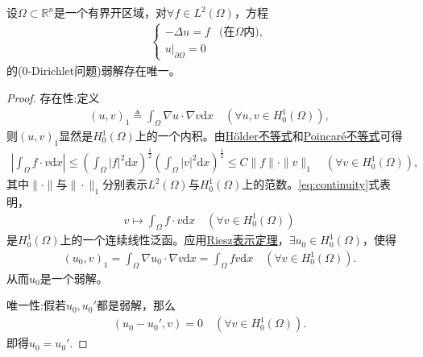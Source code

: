 \documentclass[../../main.tex]{subfiles}%
\begin{document}
\begin{theorem}
设$\Omega\subset\mathbb{R}^n$是一个有界开区域，对$\forall f\in L^2(\Omega)$，方程
\begin{align*}
\begin{cases}
-\Delta u=f & \text{(在$\Omega$内)}, \\
u|_{\partial\Omega}=0
\end{cases}
\end{align*}
的(0-Dirichlet问题)弱解存在唯一。
\end{theorem}
\begin{proof}

{\heiti 存在性:}定义
\begin{align*}
(u,v)_1\triangleq\int_\Omega \nabla u\cdot\nabla v\mathrm{d}x\quad (\forall u,v\in H_0^1(\Omega)),
\end{align*}
则$(u,v)_1$显然是$H_0^1(\Omega)$上的一个内积。由\hyperref[Real Analysis-theorem:实变函数--Hölder不等式]{Hölder不等式}和\hyperref[lemma:(庞加莱)Poincaré不等式]{Poincaré不等式}可得
\begin{align}
\left|\int_\Omega f\cdot v\mathrm{d}x\right|\leqslant\left(\int_\Omega |f|^2\mathrm{d}x\right)^{\frac{1}{2}}\left(\int_\Omega |v|^2\mathrm{d}x\right)^{\frac{1}{2}}
\leqslant C\|f\|\cdot\|v\|_1\quad (\forall v\in H_0^1(\Omega)),
\label{eq:continuity}
\end{align}
其中$\|\cdot\|$与$\|\cdot\|_1$分别表示$L^2(\Omega)$与$H_0^1(\Omega)$上的范数。\eqref{eq:continuity}式表明，
\begin{align*}
v\mapsto\int_\Omega f\cdot v\mathrm{d}x\quad (\forall v\in H_0^1(\Omega))
\end{align*}
是$H_0^1(\Omega)$上的一个连续线性泛函。应用\hyperref[theorem:Riesz表示定理(Hilbert空间)]{Riesz表示定理}，$\exists u_0\in H_0^1(\Omega)$，使得
\begin{align*}
(u_0,v)_1=\int_\Omega \nabla u_0\cdot\nabla v\mathrm{d}x=\int_\Omega fv\mathrm{d}x\quad (\forall v\in H_0^1(\Omega)).
\end{align*}
从而$u_0$是一个弱解。

{\heiti 唯一性:}假若$u_0,u_0'$都是弱解，那么
\begin{align*}
(u_0-u_0',v)=0\quad (\forall v\in H_0^1(\Omega)).
\end{align*}
即得$u_0=u_0'$.
\end{proof}
\end{document}
